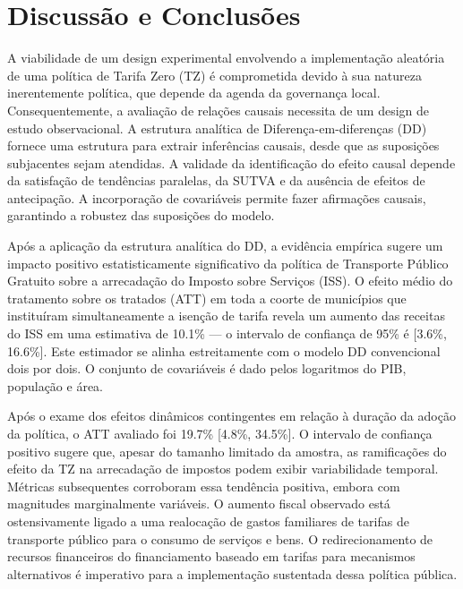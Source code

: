 \documentclass[12pt, a4paper, twoside]{article}
\numberwithin{equation}{subsection} %
\begin{document}
\newpage

\hypertarget{sec-disc-conclusions}{%
\section{Discussão e Conclusões}\label{sec-disc-conclusions}}

A viabilidade de um design experimental envolvendo a implementação
aleatória de uma política de Tarifa Zero (TZ) é comprometida devido à
sua natureza inerentemente política, que depende da agenda da governança
local. Consequentemente, a avaliação de relações causais necessita de um
design de estudo observacional. A estrutura analítica de
Diferença-em-diferenças (DD) fornece uma estrutura para extrair
inferências causais, desde que as suposições subjacentes sejam
atendidas. A validade da identificação do efeito causal depende da
satisfação de tendências paralelas, da SUTVA e da ausência de efeitos de
antecipação. A incorporação de covariáveis
\hspace{0pt}\hspace{0pt}permite fazer afirmações causais, garantindo a
robustez das suposições do modelo.

Após a aplicação da estrutura analítica do DD, a evidência empírica
sugere um impacto positivo estatisticamente significativo da política de
Transporte Público Gratuito sobre a arrecadação do Imposto sobre
Serviços (ISS). O efeito médio do tratamento sobre os tratados (ATT) em
toda a coorte de municípios que instituíram simultaneamente a isenção de
tarifa revela um aumento das receitas do ISS em uma estimativa de 10.1\%
--- o intervalo de confiança de 95\% é {[}3.6\%, 16.6\%{]}. Este
estimador se alinha estreitamente com o modelo DD convencional dois por
dois. O conjunto de covariáveis \hspace{0pt}\hspace{0pt}é dado pelos
logaritmos do PIB, população e área.

Após o exame dos efeitos dinâmicos contingentes em relação à duração da
adoção da política, o ATT avaliado foi 19.7\% {[}4.8\%, 34.5\%{]}. O
intervalo de confiança positivo sugere que, apesar do tamanho limitado
da amostra, as ramificações do efeito da TZ na arrecadação de impostos
podem exibir variabilidade temporal. Métricas subsequentes corroboram
essa tendência positiva, embora com magnitudes marginalmente variáveis.
O aumento fiscal observado está ostensivamente ligado a uma realocação
de gastos familiares de tarifas de transporte público para o consumo de
serviços e bens. O redirecionamento de recursos financeiros do
financiamento baseado em tarifas para mecanismos alternativos é
imperativo para a implementação sustentada dessa política pública.
\end{document}
